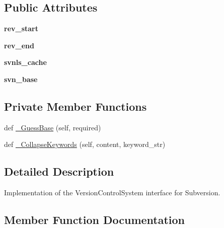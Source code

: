 \subsection*{Public Attributes}
\begin{DoxyCompactItemize}
\item 
\mbox{\label{classupload_1_1_subversion_v_c_s_ad1553a69f4a790309273dbdeb9077732}} 
{\bfseries rev\+\_\+start}
\item 
\mbox{\label{classupload_1_1_subversion_v_c_s_ac0bb07a099c722b7f8622de4b225904f}} 
{\bfseries rev\+\_\+end}
\item 
\mbox{\label{classupload_1_1_subversion_v_c_s_aa801782f807674b06f491df5d7ca9942}} 
{\bfseries svnls\+\_\+cache}
\item 
\mbox{\label{classupload_1_1_subversion_v_c_s_a60645c40d2fea4cd52881576bd13341f}} 
{\bfseries svn\+\_\+base}
\end{DoxyCompactItemize}
\subsection*{Private Member Functions}
\begin{DoxyCompactItemize}
\item 
def \mbox{\hyperlink{classupload_1_1_subversion_v_c_s_ad257205675d7d9d291145f4aa405964b}{\+\_\+\+Guess\+Base}} (self, required)
\item 
def \mbox{\hyperlink{classupload_1_1_subversion_v_c_s_ab484ddd61e217927fb61639bacdbb68d}{\+\_\+\+Collapse\+Keywords}} (self, content, keyword\+\_\+str)
\end{DoxyCompactItemize}


\subsection{Detailed Description}
\begin{DoxyVerb}Implementation of the VersionControlSystem interface for Subversion.\end{DoxyVerb}
 

\subsection{Member Function Documentation}
\mbox{\label{classupload_1_1_subversion_v_c_s_a7d22d459469a757270502ce0dccacbd2}} 
